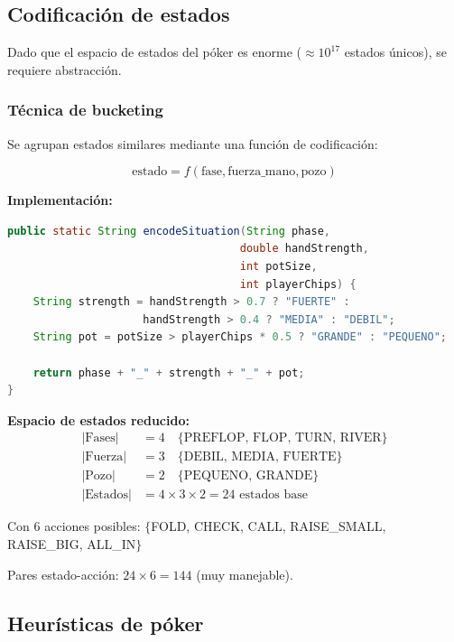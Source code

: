 \documentclass[12pt,a4paper]{article}
\begin{document}
\subsection{Codificación de estados}

Dado que el espacio de estados del póker es enorme ($\approx 10^{17}$ estados únicos), se requiere abstracción.

\subsubsection{Técnica de bucketing}

Se agrupan estados similares mediante una función de codificación:

\begin{equation}
    \text{estado} = f(\text{fase}, \text{fuerza\_mano}, \text{pozo})
\end{equation}

\textbf{Implementación:}
\begin{lstlisting}[language=Java, caption=Codificación de estados]
public static String encodeSituation(String phase, 
                                    double handStrength, 
                                    int potSize, 
                                    int playerChips) {
    String strength = handStrength > 0.7 ? "FUERTE" : 
                     handStrength > 0.4 ? "MEDIA" : "DEBIL";
    String pot = potSize > playerChips * 0.5 ? "GRANDE" : "PEQUENO";
    
    return phase + "_" + strength + "_" + pot;
}
\end{lstlisting}

\textbf{Espacio de estados reducido:}
\begin{align}
    |\text{Fases}| &= 4 \quad \{\text{PREFLOP, FLOP, TURN, RIVER}\} \\
    |\text{Fuerza}| &= 3 \quad \{\text{DEBIL, MEDIA, FUERTE}\} \\
    |\text{Pozo}| &= 2 \quad \{\text{PEQUENO, GRANDE}\} \\
    |\text{Estados}| &= 4 \times 3 \times 2 = 24 \text{ estados base}
\end{align}

Con 6 acciones posibles: $\{$FOLD, CHECK, CALL, RAISE\_SMALL, RAISE\_BIG, ALL\_IN$\}$

Pares estado-acción: $24 \times 6 = 144$ (muy manejable).

\subsection{Heurísticas de póker}
\end{document}
